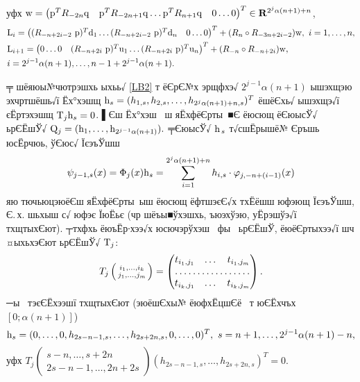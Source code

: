 \documentclass[12pt, a4paper, oneside]{article}
\begin{document}
\begin{Lem}
\[\]
уфх ${\rm w}=\begin{pmatrix}{\rm p}^T R_{-2n}{\rm q}&{\rm p}^T R_{-2n+1}{\rm q} \dots {\rm p}^TR_{n+1}{\rm q}&0 \dots 0 \end{pmatrix}^T \in {\rm\bf R}^{2^j\alpha (n+1)+n}$,
\begin{align}
&{\rm L}_i=\begin{pmatrix} (R_{-n+2i-2}{\rm ~p})^T{\rm d}_1 \dots (R_{-n+2i-2}{\rm ~p})^T{\rm d}_n&0 \dots 0\end{pmatrix}^T+(R_n\circ R_{-3n+2i-2}){\rm w},~i=1,\dots,n,\notag\\
&{\rm L}_{i+1}=\begin{pmatrix} 0 \dots 0&(R_{-n+2i}{\rm ~p})^T{\rm u}_1 \dots (R_{-n+2i}{\rm ~p})^T{\rm u}_n\end{pmatrix}^T+(R_{-n}\circ R_{-n+2i}){\rm w},\notag\\
&i=2^{j-1}\alpha (n+1),\dots,n-1+2^{j-1}\alpha (n+1).\notag
\end{align}
\end{Lem}
\par ╤ шёяюы№чютрэшхь ыхьь√ \ref{LB2}  т ёЄрЄ№х \cite{Yurgu} эрщфхэ√ $2^{j-1}\alpha (n+1)$ ышэхщэю эхчртшёшь√ї Ёх°хэшщ ${\rm h}_s=(h_{1,s},h_{2,s},\dots,h_{2^j\alpha (n+1)+n,s})^T$ ёшёЄхь√ ышэхщэ√ї єЁртэхэшщ  ${\rm T}_j {\rm h}_s=0$. ▌Єш Ёх°хэш  ш яЁхфёЄрты ■Є ёюсющ ёЄюысЎ√ ьрЄЁшЎ√ ${\rm Q}_j=({\rm h}_1,\dots,{\rm h}_{2^{j-1}\alpha (n+1)}).$
╤ЄюысЎ√ ${\rm h}_{\, s} $ т√сшЁрышё№ Єръшь юсЁрчюь, ўЄюс√ ЇєэъЎшш
\[\psi _{j-1,s} (x)=\Phi_j(x) {\rm h}_s=\sum\limits_{i=1}^{2^{j} \alpha (n+1)+n}h_{i,s} \cdot \varphi _{j,-n+(i-1)}(x)\]
яю тючьюцэюёЄш яЁхфёЄрты ыш ёюсющ ёфтшэєЄ√х тхЁёшш юфэющ ЇєэъЎшш, Є.\,х. шьхыш с√ юфэє ЇюЁьє (чр шёъы■ўхэшхь, ъюэхўэю, уЁрэшўэ√ї тхщтыхЄют).  ┬тхфхь ёюъЁр∙хээ√х юсючэрўхэш  фы  ьрЄЁшЎ, ёюёЄртыхээ√ї шч ¤ыхьхэЄют ьрЄЁшЎ√ ${\rm T}_j$:
\[
T_j\left(\begin{smallmatrix} i_1,\dots,i_k \\ j_1,\dots,j_m \end{smallmatrix} \right) = \begin{pmatrix} t_{i_1,j_1} & \dots & t_{i_1,j_m} \\ \hdotsfor{3} \\ t_{i_k,j_1} & \dots & t_{i_k,j_m} \end{pmatrix}.
\]
─ы  тэєЄЁхээшї тхщтыхЄют (эюёшЄхы№ ёюфхЁцшЄё  т юЄЁхчъх $[0;\alpha (n+1)]$)
\[
{\rm h}_s=(0,\dots,0,h_{2s-n-1,s},\dots, h_{2s+2n,s},0,\dots,0)^T, ~s=n+1,\dots,2^{j-1}\alpha (n+1)-n,
\]
 уфх $ T_j\left(\begin{smallmatrix} s-n,\dots,s+2n \\ 2s-n-1,\dots,2n+2s \end{smallmatrix} \right)(h_{2s-n-1,s},\dots,h_{2s+2n,s})^T=0.$
\end{document}
